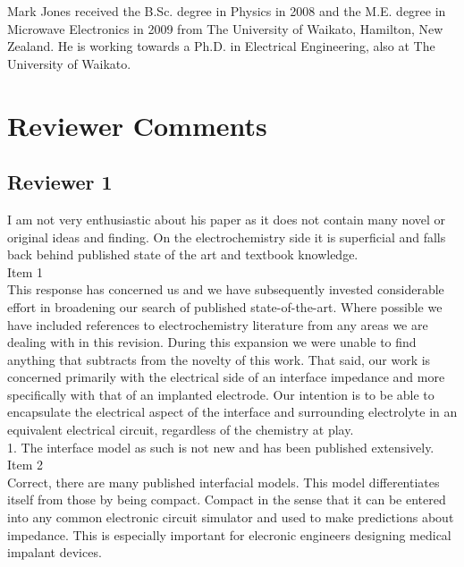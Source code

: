 \documentclass[journal, a4paper]{IEEEtran}
\begin{document}
{\begin{IEEEbiography}{Mark Jones}
received the B.Sc. degree in Physics in 2008 and the M.E. degree in Microwave Electronics in 2009 from The University of Waikato, Hamilton, New Zealand.
He is working towards a Ph.D. in Electrical Engineering, also at The University of Waikato.
\end{IEEEbiography}

\section*{Reviewer Comments}

\subsection*{Reviewer 1}

{\color{blue}
I am not very enthusiastic about his paper as it does not contain many novel or original ideas and finding. On the electrochemistry side it is superficial and falls back behind published state of the art and textbook knowledge.\\
{\color{OliveGreen}
    Item 1\\
    This response has concerned us and we have subsequently invested considerable effort in broadening our search of published state-of-the-art. Where possible we have included references to electrochemistry literature from any areas we are dealing with in this revision. During this expansion we were unable to find anything that subtracts from the novelty of this work. That said, our work is concerned primarily with the electrical side of an interface impedance and more specifically with that of an implanted electrode. Our intention is to be able to encapsulate the electrical aspect of the interface and surrounding electrolyte in an equivalent electrical circuit, regardless of the chemistry at play.
}\\

1. The interface model as such is not new and has been published extensively.\\
{\color{OliveGreen}
    Item 2\\
    Correct, there are many published interfacial models. This model differentiates itself from those by being compact. Compact in the sense that it can be entered into any common electronic circuit simulator and used to make predictions about impedance. This is especially important for elecronic engineers designing medical impalant devices.
}\\

}}
\end{document}
